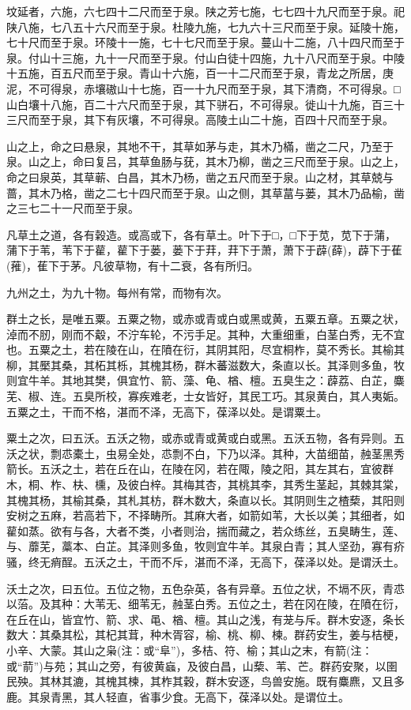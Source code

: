 \documentclass[]{article}
\begin{document}
坟延者，六施，六七四十二尺而至于泉。陕之芳七施，七七四十九尺而至于泉。祀陕八施，七八五十六尺而至于泉。杜陵九施，七九六十三尺而至于泉。延陵十施，七十尺而至于泉。环陵十一施，七十七尺而至于泉。蔓山十二施，八十四尺而至于泉。付山十三施，九十一尺而至于泉。付山白徒十四施，九十八尺而至于泉。中陵十五施，百五尺而至于泉。青山十六施，百一十二尺而至于泉，青龙之所居，庚泥，不可得泉，赤壤磝山十七施，百一十九尺而至于泉，其下清商，不可得泉。□山白壤十八施，百二十六尺而至于泉，其下骈石，不可得泉。徙山十九施，百三十三尺而至于泉，其下有灰壤，不可得泉。高陵土山二十施，百四十尺而至于泉。

山之上，命之曰悬泉，其地不干，其草如茅与走，其木乃樠，凿之二尺，乃至于泉。山之上，命曰复吕，其草鱼肠与莸，其木乃柳，凿之三尺而至于泉。山之上，命之曰泉英，其草蕲、白昌，其木乃杨，凿之五尺而至于泉。山之材，其草兢与蔷，其木乃格，凿之二七十四尺而至于泉。山之侧，其草葍与蒌，其木乃品榆，凿之三七二十一尺而至于泉。

凡草土之道，各有榖造。或高或下，各有草土。叶下于□，□下于苋，苋下于蒲，蒲下于苇，苇下于雚，雚下于蒌，蒌下于荓，荓下于萧，萧下于薜(薛)，薜下于萑(蓷)，萑下于茅。凡彼草物，有十二衰，各有所归。

九州之土，为九十物。每州有常，而物有次。

群土之长，是唯五粟。五粟之物，或赤或青或白或黑或黄，五粟五章。五粟之状，淖而不肕，刚而不觳，不泞车轮，不污手足。其种，大重细重，白茎白秀，无不宜也。五粟之土，若在陵在山，在隫在衍，其阴其阳，尽宜桐柞，莫不秀长。其榆其柳，其檿其桑，其柘其栎，其槐其杨，群木蕃滋数大，条直以长。其泽则多鱼，牧则宜牛羊。其地其樊，俱宜竹、箭、藻、龟、楢、檀。五臭生之：薜荔、白芷，麋芜、椒、连。五臭所校，寡疾难老，士女皆好，其民工巧。其泉黄白，其人夷姤。五粟之土，干而不格，湛而不泽，无高下，葆泽以处。是谓粟土。

粟土之次，曰五沃。五沃之物，或赤或青或黄或白或黑。五沃五物，各有异则。五沃之状，剽怷橐土，虫易全处，怷剽不白，下乃以泽。其种，大苗细苗，赨茎黑秀箭长。五沃之土，若在丘在山，在陵在冈，若在陬，陵之阳，其左其右，宜彼群木，桐、柞、枎、櫄，及彼白梓。其梅其杏，其桃其李，其秀生茎起，其棘其棠，其槐其杨，其榆其桑，其札其枋，群木数大，条直以长。其阴则生之楂蔾，其阳则安树之五麻，若高若下，不择畴所。其麻大者，如箭如苇，大长以美；其细者，如雚如蒸。欲有与各，大者不类，小者则治，揣而藏之，若众练丝，五臭畴生，莲、与、蘼芜，藁本、白芷。其泽则多鱼，牧则宜牛羊。其泉白青；其人坚劲，寡有疥骚，终无痟酲。五沃之土，干而不斥，湛而不泽，无高下，葆泽以处。是谓沃土。

沃土之次，曰五位。五位之物，五色杂英，各有异章。五位之状，不塥不灰，青怷以菭。及其种：大苇无、细苇无，赨茎白秀。五位之土，若在冈在陵，在隫在衍，在丘在山，皆宜竹、箭、求、黾、楢、檀。其山之浅，有茏与斥。群木安逐，条长数大：其桑其松，其杞其茸，种木胥容，榆、桃、柳、楝。群药安生，姜与桔梗，小辛、大蒙。其山之枭(注：或``阜'')，多桔、符、榆；其山之末，有箭(注：或``葥'')与苑；其山之旁，有彼黄蝱，及彼白昌，山蔾、苇、芒。群药安聚，以圉民殃。其林其漉，其槐其楝，其柞其穀，群木安逐，鸟兽安施。既有麋麃，又且多鹿。其泉青黑，其人轻直，省事少食。无高下，葆泽以处。是谓位土。
\end{document}
